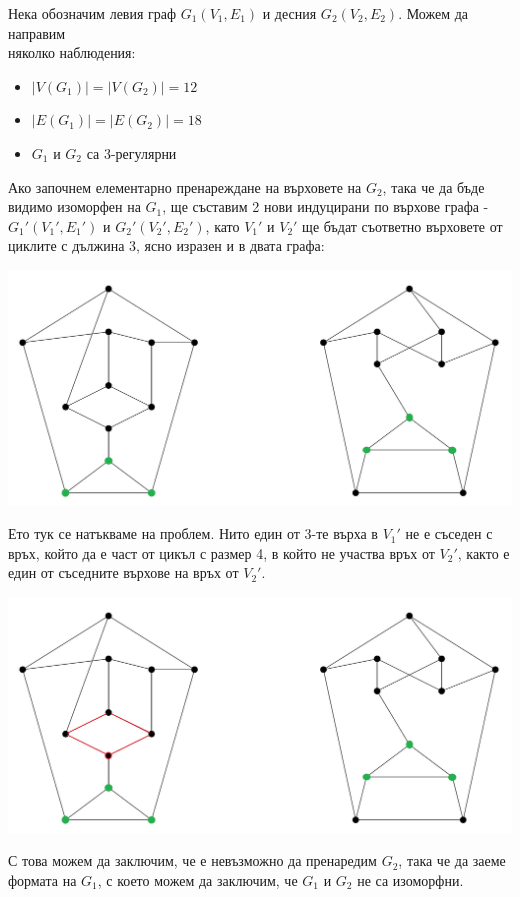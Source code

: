 \documentclass{article}
\begin{document}
Нека обозначим левия граф $G_1(V_1,E_1)$ и десния $G_2(V_2,E_2)$. Можем да направим\\
няколко наблюдения:
\begin{itemize}
    \item $|V(G_1)|=|V(G_2)|=12$
    \item $|E(G_1)|=|E(G_2)|=18$
    \item $G_1$ и $G_2$ са 3-регулярни
\end{itemize}
Ако започнем елементарно пренареждане на върховете на $G_2$, така че да бъде
видимо изоморфен на $G_1$, ще съставим 2 нови индуцирани по върхове графа - $G_1'(V_1',E_1')$
и $G_2'(V_2',E_2')$, като $V_1'$ и $V_2'$ ще бъдат съответно върховете от циклите
с дължина 3, ясно изразен и в двата графа:
\begin{center}
    \includegraphics*[scale=0.2]{img2}
\end{center}
\newpage
Ето тук се натъкваме на проблем. Нито един от 3-те върха в $V_1'$
не е съседен с връх, който да е част от цикъл с размер 4,
в който не участва връх от $V_2'$, както е един от съседните върхове на връх от $V_2'$.
\begin{center}
    \includegraphics*[scale=0.2]{img3}
\end{center}
С това можем да заключим, че е невъзможно да пренаредим $G_2$, така че да
заеме формата на $G_1$, с което можем да заключим, че $G_1$ и $G_2$ не са изоморфни.
\end{document}
